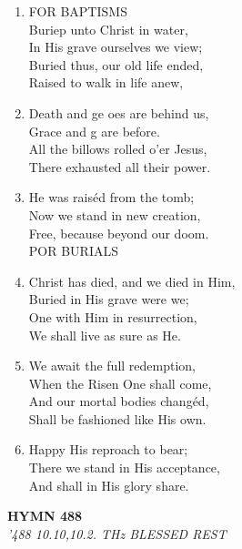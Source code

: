 \documentclass[11pt,a4paper]{article}
\begin{document}
\begin{enumerate}
    \item FOR BAPTISMS \\
        Buriep unto Christ in water, \\
        In His grave ourselves we view; \\
        Buried thus, our old life ended, \\
        Raised to walk in life anew,

    \item Death and ge oes are behind us, \\
        Grace and g are before. \\
        All the billows rolled o'er Jesus, \\
        There exhausted all their power.

    \item He was raiséd from the tomb; \\
        Now we stand in new creation, \\
        Free, because beyond our doom. \\
        POR BURIALS

    \item Christ has died, and we died in Him, \\
        Buried in His grave were we; \\
        One with Him in resurrection, \\
        We shall live as sure as He.

    \item We await the full redemption, \\
        When the Risen One shall come, \\
        And our mortal bodies changéd, \\
        Shall be fashioned like His own.

    \item Happy His reproach to bear; \\
        There we stand in His acceptance, \\
        And shall in His glory share.

\end{enumerate}

\newpage
\begin{center}
    {\Large \textbf{HYMN 488}}
    \\
    \textit{'488 10.10,10.2. THz BLESSED REST}
\end{center}
\vspace{1em}
\end{document}
